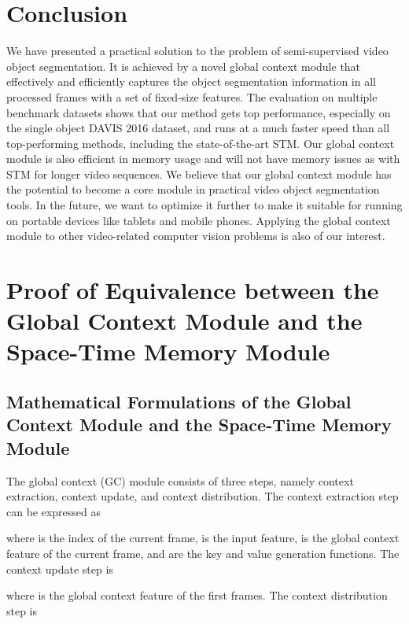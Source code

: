 \documentclass[runningheads]{llncs}
\begin{document}
\section{Conclusion}
\label{sec:conclusion}

We have presented a practical solution to the problem of semi-supervised video object segmentation. It is achieved by a novel global context module that effectively and efficiently captures the object segmentation information in all processed frames with a set of fixed-size features. The evaluation on multiple benchmark datasets shows that our method gets top performance, especially on the single object DAVIS 2016 dataset, and runs at a much faster speed than all top-performing methods, including the state-of-the-art STM. Our global context module is also efficient in memory usage and will not have memory issues as with STM for longer video sequences. We believe that our global context module has the potential to become a core module in practical video object segmentation tools. In the future, we want to optimize it further to make it suitable for running on portable devices like tablets and mobile phones. Applying the global context module to other video-related computer vision problems is also of our interest.

\clearpage




\clearpage
\appendix

\section{Proof of Equivalence between the Global Context Module and the Space-Time Memory Module}
\label{sec:method}

\subsection{Mathematical Formulations of the Global Context Module and the Space-Time Memory Module}

The global context (GC) module consists of three steps, namely context extraction, context update, and context distribution. The context extraction step can be expressed as

where  is the index of the current frame,  is the input feature,  is the global context feature of the current frame, and  are the key and value generation functions. The context update step is

where  is the global context feature of the first  frames. The context distribution step is
\end{document}
